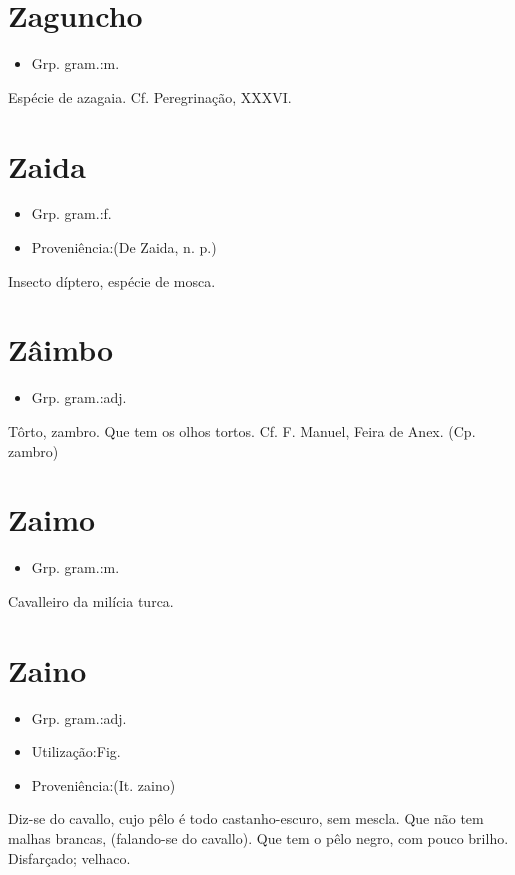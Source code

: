 \section{Zaguncho}
\begin{itemize}
\item {Grp. gram.:m.}
\end{itemize}
Espécie de azagaia. Cf. \textunderscore Peregrinação\textunderscore , XXXVI.
\section{Zaida}
\begin{itemize}
\item {Grp. gram.:f.}
\end{itemize}
\begin{itemize}
\item {Proveniência:(De \textunderscore Zaida\textunderscore , n. p.)}
\end{itemize}
Insecto díptero, espécie de mosca.
\section{Zâimbo}
\begin{itemize}
\item {Grp. gram.:adj.}
\end{itemize}
Tôrto, zambro.
Que tem os olhos tortos. Cf. F. Manuel, \textunderscore Feira de Anex.\textunderscore 
(Cp. \textunderscore zambro\textunderscore )
\section{Zaimo}
\begin{itemize}
\item {Grp. gram.:m.}
\end{itemize}
Cavalleiro da milícia turca.
\section{Zaino}
\begin{itemize}
\item {Grp. gram.:adj.}
\end{itemize}
\begin{itemize}
\item {Utilização:Fig.}
\end{itemize}
\begin{itemize}
\item {Proveniência:(It. \textunderscore zaino\textunderscore )}
\end{itemize}
Diz-se do cavallo, cujo pêlo é todo castanho-escuro, sem mescla.
Que não tem malhas brancas, (falando-se do cavallo).
Que tem o pêlo negro, com pouco brilho.
Disfarçado; velhaco.
